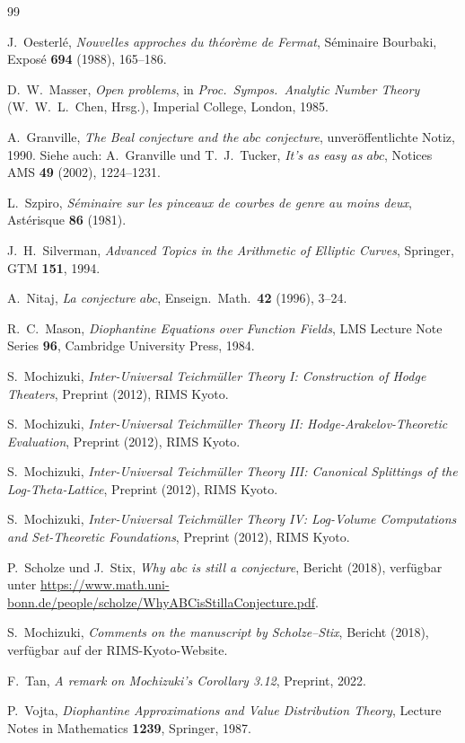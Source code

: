 \documentclass[12pt,a4paper]{article}
\theoremstyle{remark}
\begin{document}
\begin{thebibliography}{99}

J.~Oesterlé,
\textit{Nouvelles approches du théorème de Fermat},
Séminaire Bourbaki, Exposé \textbf{694} (1988), 165--186.

D.~W.~Masser,
\textit{Open problems},
in \textit{Proc.\ Sympos.\ Analytic Number Theory} (W.~W.~L.~Chen, Hrsg.),
Imperial College, London, 1985.

A.~Granville,
\textit{The Beal conjecture and the $abc$ conjecture},
unveröffentlichte Notiz, 1990.
Siehe auch: A.~Granville und T.~J.~Tucker,
\textit{It's as easy as $abc$},
Notices AMS \textbf{49} (2002), 1224--1231.

L.~Szpiro,
\textit{Séminaire sur les pinceaux de courbes de genre au moins deux},
Astérisque \textbf{86} (1981).

J.~H.~Silverman,
\textit{Advanced Topics in the Arithmetic of Elliptic Curves},
Springer, GTM \textbf{151}, 1994.

A.~Nitaj,
\textit{La conjecture $abc$},
Enseign.\ Math.\ \textbf{42} (1996), 3--24.

R.~C.~Mason,
\textit{Diophantine Equations over Function Fields},
LMS Lecture Note Series \textbf{96}, Cambridge University Press, 1984.

S.~Mochizuki,
\textit{Inter-Universal Teichmüller Theory I: Construction of Hodge Theaters},
Preprint (2012), RIMS Kyoto.

S.~Mochizuki,
\textit{Inter-Universal Teichmüller Theory II: Hodge-Arakelov-Theoretic Evaluation},
Preprint (2012), RIMS Kyoto.

S.~Mochizuki,
\textit{Inter-Universal Teichmüller Theory III: Canonical Splittings of the Log-Theta-Lattice},
Preprint (2012), RIMS Kyoto.

S.~Mochizuki,
\textit{Inter-Universal Teichmüller Theory IV: Log-Volume Computations and Set-Theoretic Foundations},
Preprint (2012), RIMS Kyoto.

P.~Scholze und J.~Stix,
\textit{Why abc is still a conjecture},
Bericht (2018), verfügbar unter \url{https://www.math.uni-bonn.de/people/scholze/WhyABCisStillaConjecture.pdf}.

S.~Mochizuki,
\textit{Comments on the manuscript by Scholze--Stix},
Bericht (2018), verfügbar auf der RIMS-Kyoto-Website.

F.~Tan,
\textit{A remark on Mochizuki's Corollary 3.12},
Preprint, 2022.

P.~Vojta,
\textit{Diophantine Approximations and Value Distribution Theory},
Lecture Notes in Mathematics \textbf{1239}, Springer, 1987.

\end{thebibliography}
\end{document}
